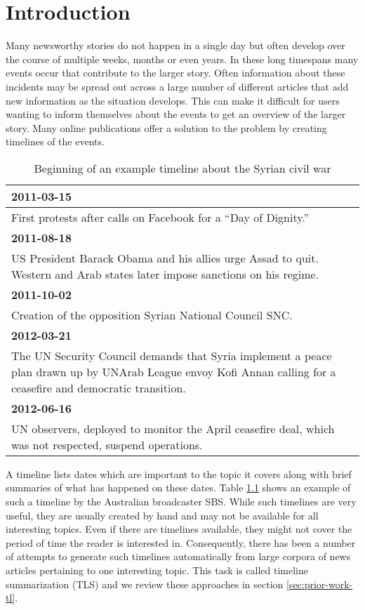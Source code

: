 \documentclass[a4paper,BCOR=10mm]{report}
\numberwithin{lemma}{chapter}
\numberwithin{definition}{chapter}
\begin{document}


\chapter{Introduction}

Many newsworthy stories do not happen in a single day but often develop over the course of multiple weeks, months or even years. In these long timespans many events occur that contribute to the larger story. Often information about these incidents may be spread out across a large number of different articles that add new information as the situation develops. This can make it difficult for users wanting to inform themselves about the events to get an overview of the larger story. Many online publications offer a solution to the problem by creating timelines of the events.

\begin{table}
\begin{tabularx}{\textwidth}{|X|}
\hline
\textbf{2011-03-15} \\\hline
First protests after calls on Facebook for a ``Day of Dignity.'' \\\hline
\textbf{2011-08-18} \\\hline
US President Barack Obama and his allies urge Assad to quit. \newline Western and Arab states later impose sanctions on his regime. \\\hline
\textbf{2011-10-02} \\\hline
Creation of the opposition Syrian National Council SNC. \\\hline
\textbf{2012-03-21} \\\hline
The UN Security Council demands that Syria implement a peace plan drawn up by UNArab League envoy Kofi Annan calling for a ceasefire and democratic transition. \\\hline
\textbf{2012-06-16} \\\hline
UN observers, deployed to monitor the April ceasefire deal, which was not respected, suspend operations. \\\hline
\end{tabularx}
\caption{Beginning of an example timeline about the Syrian civil war}
\label{tab:example-tl}
\end{table}

A timeline lists dates which are important to the topic it covers along with brief summaries of what has happened on these dates. Table \ref{tab:example-tl} shows an example of such a timeline by the Australian broadcaster SBS.
While such timelines are very useful, they are usually created by hand and may not be available for all interesting topics. Even if there are timelines available, they might not cover the period of time the reader is interested in.
Consequently, there has been a number of attempts to generate such timelines automatically from large corpora of news articles pertaining to one interesting topic. This task is called timeline summarization (TLS) and we review these approaches in section \ref{sec:prior-work-tl}.
\end{document}

